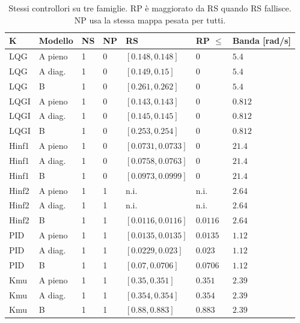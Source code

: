 \begin{table}[htbp]\centering\small
\begin{tabular}{lllllll}\toprule
K & Modello & NS & NP & RS & RP $\le$ & Banda [rad/s]\\\midrule
LQG & A pieno & 1 & 0 & $[0.148,0.148]$ & $0$ & $5.4$\\
LQG & A diag. & 1 & 0 & $[0.149,0.15]$ & $0$ & $5.4$\\
LQG & B & 1 & 0 & $[0.261,0.262]$ & $0$ & $5.4$\\
LQGI & A pieno & 1 & 0 & $[0.143,0.143]$ & $0$ & $0.812$\\
LQGI & A diag. & 1 & 0 & $[0.145,0.145]$ & $0$ & $0.812$\\
LQGI & B & 1 & 0 & $[0.253,0.254]$ & $0$ & $0.812$\\
Hinf1 & A pieno & 1 & 0 & $[0.0731,0.0733]$ & $0$ & $21.4$\\
Hinf1 & A diag. & 1 & 0 & $[0.0758,0.0763]$ & $0$ & $21.4$\\
Hinf1 & B & 1 & 0 & $[0.0973,0.0999]$ & $0$ & $21.4$\\
Hinf2 & A pieno & 1 & 1 & n.i. & n.i. & $2.64$\\
Hinf2 & A diag. & 1 & 1 & n.i. & n.i. & $2.64$\\
Hinf2 & B & 1 & 1 & $[0.0116,0.0116]$ & $0.0116$ & $2.64$\\
PID & A pieno & 1 & 1 & $[0.0135,0.0135]$ & $0.0135$ & $1.12$\\
PID & A diag. & 1 & 1 & $[0.0229,0.023]$ & $0.023$ & $1.12$\\
PID & B & 1 & 1 & $[0.07,0.0706]$ & $0.0706$ & $1.12$\\
Kmu & A pieno & 1 & 1 & $[0.35,0.351]$ & $0.351$ & $2.39$\\
Kmu & A diag. & 1 & 1 & $[0.354,0.354]$ & $0.354$ & $2.39$\\
Kmu & B & 1 & 1 & $[0.88,0.883]$ & $0.883$ & $2.39$\\
\bottomrule\end{tabular}
\caption{Stessi controllori su tre famiglie. RP è maggiorato da RS quando RS fallisce. NP usa la stessa mappa pesata per tutti.}
\end{table}
